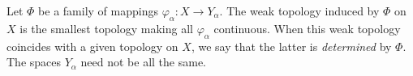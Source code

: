 Let $\Phi$ be a family of mappings $\varphi_{\alpha}: X \to Y_{\alpha}$. The weak topology induced by $\Phi$ on $X$ is the smallest topology making all $\varphi_{\alpha}$ continuous. When this weak topology coincides with a given topology on $X$, we say that the latter is \emph{determined} by $\Phi$. The spaces $Y_{\alpha}$ need not be all the same.
